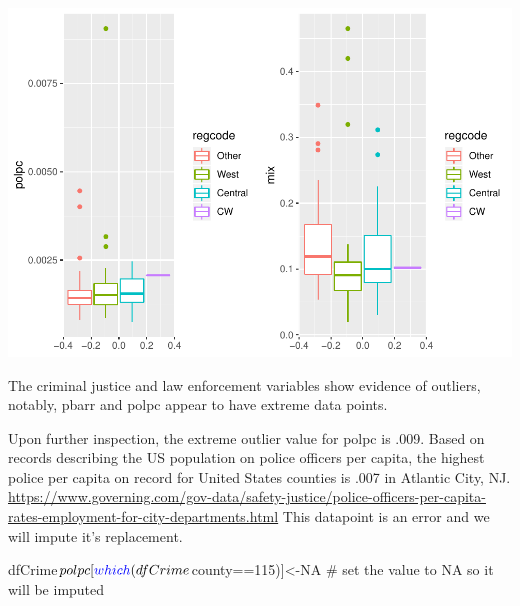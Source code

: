 \documentclass[]{article}
\newenvironment{Shaded}{}{}
\newcommand{\CommentTok}[1]{\textcolor[rgb]{0.00,0.50,0.00}{#1}}
\newcommand{\DecValTok}[1]{#1}
\newcommand{\KeywordTok}[1]{\textcolor[rgb]{0.00,0.00,1.00}{#1}}
\newcommand{\NormalTok}[1]{#1}
\newcommand{\OperatorTok}[1]{#1}
\newcommand{\OtherTok}[1]{\textcolor[rgb]{1.00,0.25,0.00}{#1}}
\begin{document}
\includegraphics{Bagnard_Gaustad_Hartman_Leung_Lab_3_files/figure-latex/unnamed-chunk-22-3.pdf}

The criminal justice and law enforcement variables show evidence of
outliers, notably, pbarr and polpc appear to have extreme data points.

Upon further inspection, the extreme outlier value for polpc is .009.
Based on records describing the US population on police officers per
capita, the highest police per capita on record for United States
counties is .007 in Atlantic City, NJ.
\url{https://www.governing.com/gov-data/safety-justice/police-officers-per-capita-rates-employment-for-city-departments.html}
This datapoint is an error and we will impute it's replacement.

\begin{Shaded}
\begin{Highlighting}[]
\NormalTok{dfCrime}\OperatorTok{$}\NormalTok{polpc[}\KeywordTok{which}\NormalTok{(dfCrime}\OperatorTok{$}\NormalTok{county}\OperatorTok{==}\DecValTok{115}\NormalTok{)]<-}\OtherTok{NA} \CommentTok{# set the value to NA so it will be imputed}
\end{Highlighting}
\end{Shaded}
\end{document}
